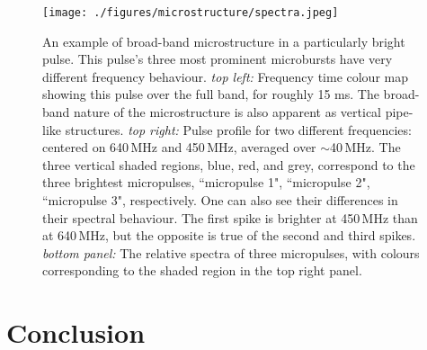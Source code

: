 \begin{figure}[!h]
\vspace{-0.5cm}
\begin{center}
\texttt{[image: ./figures/microstructure/spectra.jpeg]}
\caption{An example of broad-band microstructure in a 
particularly bright pulse. This pulse's three most prominent 
microbursts have very different frequency behaviour. \textit{top left:}
Frequency time colour map showing this pulse over the 
full band, for roughly 15 ms. The broad-band nature of 
the microstructure is also apparent as 
vertical pipe-like structures. \textit{top right:} Pulse 
profile for two different frequencies: centered on 640\,MHz and 450\,MHz, 
averaged over $\sim$40\,MHz. The three vertical shaded regions, 
blue, red, and grey, correspond to the three brightest 
micropulses, ``micropulse 1", ``micropulse 2", ``micropulse 3", 
respectively. One can also see their differences in their 
spectral behaviour. The first spike is brighter at 450\,MHz
than at 640\,MHz, but the opposite is true of the
second and third spikes. \textit{bottom panel:} The relative 
spectra of three micropulses, with colours corresponding 
to the shaded region in the top right panel.}
\label{fig-spectralvar}
\end{center}
\end{figure}






\section{Conclusion}
\label{sec:conclusion}
  
